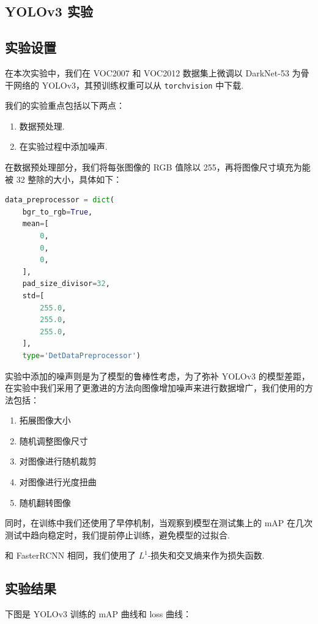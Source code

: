 \documentclass[notitlepage,cs4size,punct,oneside]{ctexrep}
\numberwithin{equation}{chapter}
\theoremstyle{mystyle}
\begin{document}
\subsection{YOLOv3 实验}
\subsection{实验设置}
在本次实验中，我们在 VOC2007 和 VOC2012 数据集上微调以 DarkNet-53 为骨干网络的 YOLOv3，其预训练权重可以从 \lstinline|torchvision| 中下载.

我们的实验重点包括以下两点：

\begin{enumerate}
    \item 数据预处理.
    \item 在实验过程中添加噪声.
\end{enumerate}

在数据预处理部分，我们将每张图像的 RGB 值除以 255，再将图像尺寸填充为能被 32 整除的大小，具体如下：

\begin{lstlisting}[language=Python]
data_preprocessor = dict(
    bgr_to_rgb=True,
    mean=[
        0,
        0,
        0,
    ],
    pad_size_divisor=32,
    std=[
        255.0,
        255.0,
        255.0,
    ],
    type='DetDataPreprocessor')
\end{lstlisting}

实验中添加的噪声则是为了模型的鲁棒性考虑，为了弥补 YOLOv3 的模型差距，在实验中我们采用了更激进的方法向图像增加噪声来进行数据增广，我们使用的方法包括：

\begin{enumerate}
    \item 拓展图像大小
    \item 随机调整图像尺寸
    \item 对图像进行随机裁剪
    \item 对图像进行光度扭曲
    \item 随机翻转图像
\end{enumerate}

同时，在训练中我们还使用了早停机制，当观察到模型在测试集上的 mAP 在几次测试中趋向稳定时，我们提前停止训练，避免模型的过拟合.

和 FasterRCNN 相同，我们使用了 $L^{1}$-损失和交叉熵来作为损失函数.
\subsection{实验结果}

下图是 YOLOv3 训练的 mAP 曲线和 loss 曲线：
\end{document}
